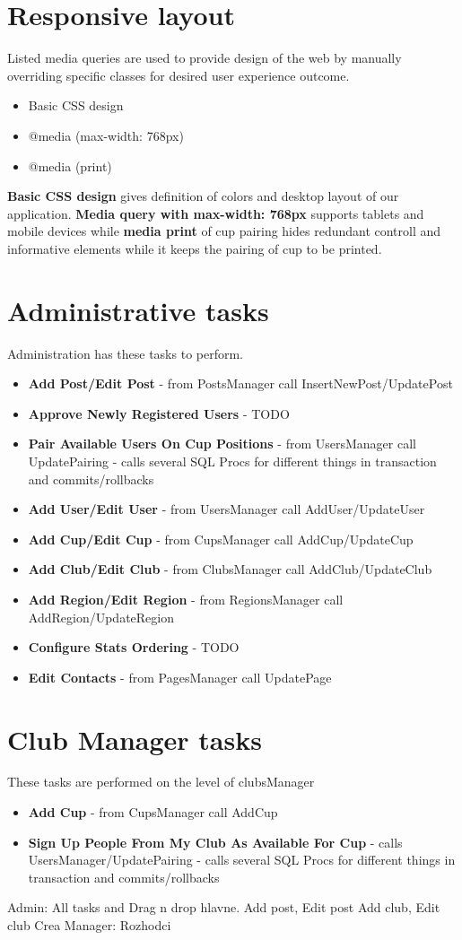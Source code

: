 \section{Responsive layout}
Listed media queries are used to provide design of the web by manually overriding specific classes for desired user experience outcome.
\begin{itemize}
    \item Basic CSS design
    \item @media (max-width: 768px)
    \item @media (print)
\end{itemize}
\textbf{Basic CSS design} gives definition of colors and desktop layout of our application. \textbf{Media query with max-width: 768px} supports tablets and mobile devices while \textbf{media print} of cup pairing hides redundant controll and informative elements while it keeps the pairing of cup to be printed.
\section{Administrative tasks}
Administration has these tasks to perform.
\begin{itemize}
    \item \textbf{Add Post/Edit Post} - from PostsManager call InsertNewPost/UpdatePost
    \item \textbf{Approve Newly Registered Users} - TODO
    \item \textbf{Pair Available Users On Cup Positions} - from UsersManager call UpdatePairing - calls several SQL Procs for different things in transaction and commits/rollbacks
    \item \textbf{Add User/Edit User} - from UsersManager call AddUser/UpdateUser
    \item \textbf{Add Cup/Edit Cup} - from CupsManager call AddCup/UpdateCup
    \item \textbf{Add Club/Edit Club} - from ClubsManager call AddClub/UpdateClub
    \item \textbf{Add Region/Edit Region} - from RegionsManager call AddRegion/UpdateRegion
    \item \textbf{Configure Stats Ordering} - TODO
    \item \textbf{Edit Contacts} - from PagesManager call UpdatePage
\end{itemize} 
\section{Club Manager tasks}
These tasks are performed on the level of clubsManager
\begin{itemize}
    \item \textbf{Add Cup} - from CupsManager call AddCup
    \item \textbf{Sign Up People From My Club As Available For Cup} - calls UsersManager/UpdatePairing - calls several SQL Procs for different things in transaction and commits/rollbacks
\end{itemize}       
Admin:
All tasks and Drag n drop hlavne.
Add post, Edit post
Add club, Edit club
Crea
Manager:
Rozhodci
